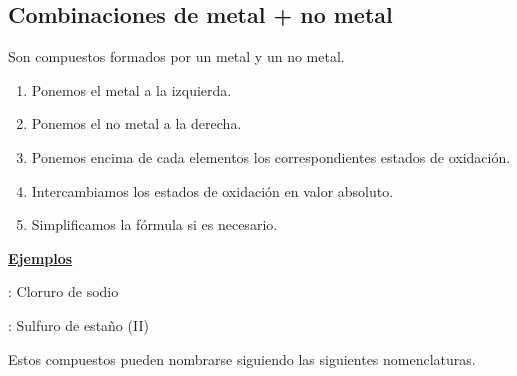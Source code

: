 \documentclass[12pt]{article}
\begin{document}
\subsection{Combinaciones de metal + no metal}

Son compuestos formados por un metal y un no metal.

\vspace*{2mm}
\begin{enumerate}[label=\itembolascolor{\arabic*}{green!40!black}]
    \item Ponemos el metal a la izquierda.
    \item Ponemos el no metal a la derecha.
    \item Ponemos encima de cada elementos los correspondientes estados de oxidación.
    \item Intercambiamos los estados de oxidación en valor absoluto.
    \item Simplificamos la fórmula si es necesario.
\end{enumerate}

\textbf{\uline{Ejemplos}}

 : Cloruro de sodio \ch{->}   \ch{->} 

 : Sulfuro de estaño (II) \ch{->}   \ch{->}  \ch{->} 

\vspace*{2mm}

Estos compuestos pueden nombrarse siguiendo las siguientes nomenclaturas.
\end{document}
